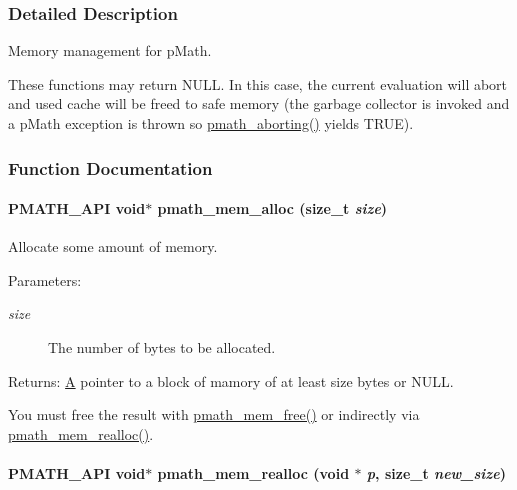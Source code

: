 \subsubsection{Detailed Description}
Memory management for pMath. 

These functions may return NULL. In this case, the current evaluation will abort and used cache will be freed to safe memory (the garbage collector is invoked and a pMath exception is thrown so \hyperlink{group__threads_gb75a9c87401fddb42b297ddb0495415f}{pmath\_\-aborting()} yields TRUE). 

\subsubsection{Function Documentation}
\hypertarget{group__memory_g856c326c830629de5637912fa8bc2bc9}{
\paragraph[{pmath\_\-mem\_\-alloc}]{\setlength{\rightskip}{0pt plus 5cm}PMATH\_\-API void$\ast$ pmath\_\-mem\_\-alloc (size\_\-t {\em size})}\hfill}
\label{group__memory_g856c326c830629de5637912fa8bc2bc9}


Allocate some amount of memory. 

\begin{Desc}
\item[Parameters:]
\begin{description}
\item[{\em size}]The number of bytes to be allocated. \end{description}
\end{Desc}
\begin{Desc}
\item[Returns:]\hyperlink{class_a}{A} pointer to a block of mamory of at least size bytes or NULL.\end{Desc}
You must free the result with \hyperlink{group__memory_g936d3001151c35052812e597eb7dce4f}{pmath\_\-mem\_\-free()} or indirectly via \hyperlink{group__memory_g59dc67a7de0dc3111dfb0424df8d8244}{pmath\_\-mem\_\-realloc()}. \hypertarget{group__memory_g59dc67a7de0dc3111dfb0424df8d8244}{
\paragraph[{pmath\_\-mem\_\-realloc}]{\setlength{\rightskip}{0pt plus 5cm}PMATH\_\-API void$\ast$ pmath\_\-mem\_\-realloc (void $\ast$ {\em p}, \/  size\_\-t {\em new\_\-size})}\hfill}
\label{group__memory_g59dc67a7de0dc3111dfb0424df8d8244}


